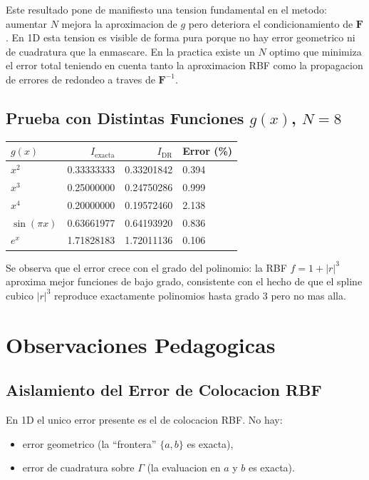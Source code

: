 \documentclass[12pt,a4paper]{article}
\begin{document}
Este resultado pone de manifiesto una tension fundamental en el metodo:
aumentar $N$ mejora la aproximacion de $g$ pero deteriora el
condicionamiento de $\mathbf{F}$. En 1D esta tension es visible de forma
pura porque no hay error geometrico ni de cuadratura que la enmascare.
En la practica existe un $N$ optimo que minimiza el error total teniendo
en cuenta tanto la aproximacion RBF como la propagacion de errores de
redondeo a traves de $\mathbf{F}^{-1}$.

\subsection{Prueba con Distintas Funciones $g(x)$, $N=8$}

\begin{center}
\begin{tabular}{lrrl}
\toprule
$g(x)$ & $I_{\text{exacta}}$ & $I_{\text{DR}}$ & Error (\%) \\
\midrule
$x^2$       & 0.33333333 & 0.33201842 & 0.394 \\
$x^3$       & 0.25000000 & 0.24750286 & 0.999 \\
$x^4$       & 0.20000000 & 0.19572460 & 2.138 \\
$\sin(\pi x)$ & 0.63661977 & 0.64193920 & 0.836 \\
$e^x$       & 1.71828183 & 1.72011136 & 0.106 \\
\bottomrule
\end{tabular}
\end{center}

Se observa que el error crece con el grado del polinomio: la RBF
$f = 1 + |r|^3$ aproxima mejor funciones de bajo grado, consistente con
el hecho de que el spline cubico $|r|^3$ reproduce exactamente polinomios
hasta grado 3 pero no mas alla.

\section{Observaciones Pedagogicas}

\subsection{Aislamiento del Error de Colocacion RBF}

En 1D el unico error presente es el de colocacion RBF. No hay:
\begin{itemize}
    \item error geometrico (la ``frontera'' $\{a,b\}$ es exacta),
    \item error de cuadratura sobre $\Gamma$ (la evaluacion en $a$ y $b$
    es exacta).
\end{itemize}
\end{document}
